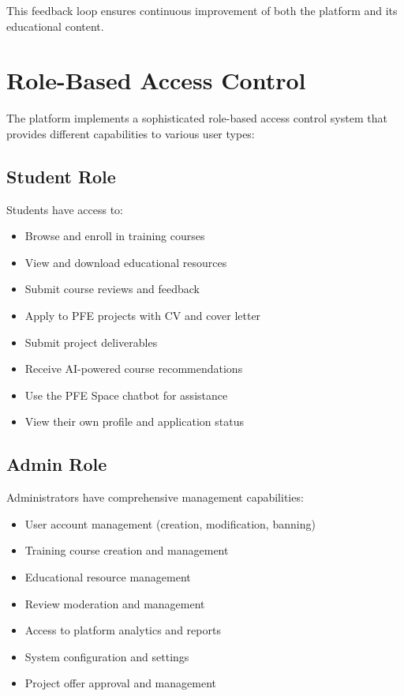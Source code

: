 \documentclass[12pt,a4paper]{report}
\begin{document}
This feedback loop ensures continuous improvement of both the platform and its educational content.

\section{Role-Based Access Control}
The platform implements a sophisticated role-based access control system that provides different capabilities to various user types:

\subsection{Student Role}
Students have access to:

\begin{itemize}
    \item Browse and enroll in training courses
    \item View and download educational resources
    \item Submit course reviews and feedback
    \item Apply to PFE projects with CV and cover letter
    \item Submit project deliverables
    \item Receive AI-powered course recommendations
    \item Use the PFE Space chatbot for assistance
    \item View their own profile and application status
\end{itemize}

\subsection{Admin Role}
Administrators have comprehensive management capabilities:

\begin{itemize}
    \item User account management (creation, modification, banning)
    \item Training course creation and management
    \item Educational resource management
    \item Review moderation and management
    \item Access to platform analytics and reports
    \item System configuration and settings
    \item Project offer approval and management
\end{itemize}
\end{document}
